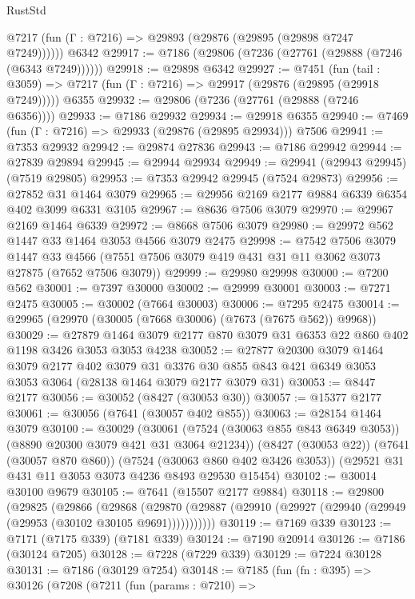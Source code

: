 \begin{lexlean}{RustStd}
\begin{coremodule}
      @7217 (fun (Γ : @7216) => @29893 (@29876 (@29895 (@29898 @7247 @7249))))))
    @6342
@29917 := @7186 (@29806 (@7236 (@27761 (@29888 (@7246 (@6343 @7249))))))
@29918 := @29898 @6342
@29927 := @7451
    (fun (tail : @3059) => @7217 (fun (Γ : @7216) => @29917 (@29876 (@29895 (@29918 @7249)))))
    @6355
@29932 := @29806 (@7236 (@27761 (@29888 (@7246 @6356))))
@29933 := @7186 @29932
@29934 := @29918 @6355
@29940 := @7469 (fun (Γ : @7216) => @29933 (@29876 (@29895 @29934))) @7506
@29941 := @7353 @29932
@29942 := @29874 @27836
@29943 := @7186 @29942
@29944 := @27839 @29894
@29945 := @29944 @29934
@29949 := @29941 (@29943 @29945) (@7519 @29805)
@29953 := @7353 @29942 @29945 (@7524 @29873)
@29956 := @27852 @31 @1464 @3079
@29965 := @29956 @2169 @2177 @9884 @6339 @6354 @402 @3099 @6331 @3105
@29967 := @8636 @7506 @3079
@29970 := @29967 @2169 @1464 @6339
@29972 := @8668 @7506 @3079
@29980 := @29972 @562 @1447 @33 @1464 @3053 @4566 @3079 @2475
@29998 := @7542
    @7506
    @3079
    @1447
    @33
    @4566
    (@7551 @7506 @3079 @419 @431 @31 @11 @3062 @3073 @27875 (@7652 @7506 @3079))
@29999 := @29980 @29998
@30000 := @7200 @562
@30001 := @7397 @30000
@30002 := @29999 @30001
@30003 := @7271 @2475
@30005 := @30002 (@7664 @30003)
@30006 := @7295 @2475
@30014 := @29965 (@29970 (@30005 (@7668 @30006) (@7673 (@7675 @562)) @9968))
@30029 := @27879 @1464 @3079 @2177 @870 @3079 @31 @6353 @22 @860 @402 @1198 @3426 @3053 @3053 @4238
@30052 := @27877
    @20300
    @3079
    @1464
    @3079
    @2177
    @402
    @3079
    @31
    @3376
    @30
    @855
    @843
    @421
    @6349
    @3053
    @3053
    @3064
    (@28138 @1464 @3079 @2177 @3079 @31)
@30053 := @8447 @2177
@30056 := @30052 (@8427 (@30053 @30))
@30057 := @15377 @2177
@30061 := @30056 (@7641 (@30057 @402 @855))
@30063 := @28154 @1464 @3079
@30100 := @30029
    (@30061 (@7524 (@30063 @855 @843 @6349 @3053)) (@8890 @20300 @3079 @421 @31 @3064 @21234))
    (@8427 (@30053 @22))
    (@7641 (@30057 @870 @860))
    (@7524 (@30063 @860 @402 @3426 @3053))
    (@29521 @31 @431 @11 @3053 @3073 @4236 @8493 @29530 @15454)
@30102 := @30014 @30100 @9679
@30105 := @7641 (@15507 @2177 @9884)
@30118 := @29800
    (@29825
      (@29866
        (@29868
          (@29870 (@29887 (@29910 (@29927 (@29940 (@29949 (@29953 (@30102 @30105 @9691)))))))))))
@30119 := @7169 @339
@30123 := @7171 (@7175 @339) (@7181 @339)
@30124 := @7190 @20914
@30126 := @7186 (@30124 @7205)
@30128 := @7228 (@7229 @339)
@30129 := @7224 @30128
@30131 := @7186 (@30129 @7254)
@30148 := @7185
    (fun (fn : @395) =>
    @30126
      (@7208
        (@7211
          (fun (params : @7210) =>

\end{coremodule}
\end{lexlean}
